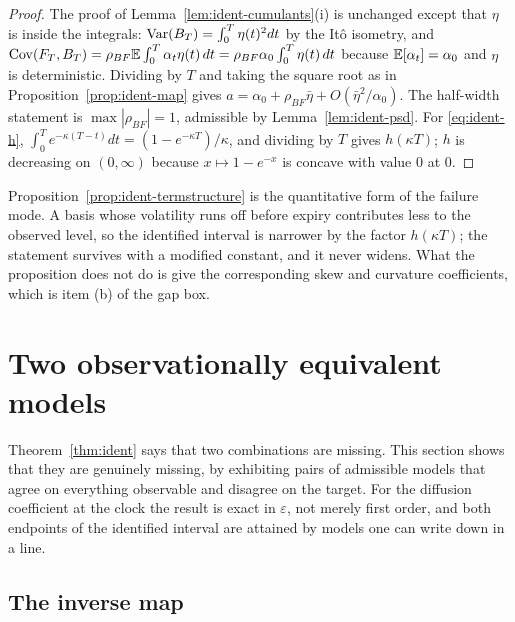 \documentclass[../../../main.tex]{subfiles}
\begin{document}
\begin{proof}
The proof of Lemma~\ref{lem:ident-cumulants}(i) is unchanged except that $\eta$ is inside the integrals: $\operatorname{Var}(B_T)=\int_0^T\eta(t)^2dt$ by the It\^o isometry, and $\operatorname{Cov}(F_T,B_T)=\rho_{BF}\mathbb{E}\int_0^T\alpha_t\eta(t)\,dt=\rho_{BF}\alpha_0\int_0^T\eta(t)\,dt$ because $\mathbb{E}[\alpha_t]=\alpha_0$ and $\eta$ is deterministic. Dividing by $T$ and taking the square root as in Proposition~\ref{prop:ident-map} gives $a=\alpha_0+\rho_{BF}\bar\eta+O(\bar\eta^2/\alpha_0)$. The half-width statement is $\max|\rho_{BF}|=1$, admissible by Lemma~\ref{lem:ident-psd}. For \eqref{eq:ident-h}, $\int_0^Te^{-\kappa(T-t)}dt=(1-e^{-\kappa T})/\kappa$, and dividing by $T$ gives $h(\kappa T)$; $h$ is decreasing on $(0,\infty)$ because $x\mapsto1-e^{-x}$ is concave with value $0$ at $0$.
\end{proof}

Proposition~\ref{prop:ident-termstructure} is the quantitative form of the failure mode. A basis whose volatility runs off before expiry contributes less to the observed level, so the identified interval is narrower by the factor $h(\kappa T)$; the statement survives with a modified constant, and it never widens. What the proposition does not do is give the corresponding skew and curvature coefficients, which is item (b) of the gap box.

\section{Two observationally equivalent models}\label{sec:ident-thm4}

Theorem~\ref{thm:ident} says that two combinations are missing. This section shows that they are genuinely missing, by exhibiting pairs of admissible models that agree on everything observable and disagree on the target. For the diffusion coefficient at the clock the result is exact in $\varepsilon$, not merely first order, and both endpoints of the identified interval are attained by models one can write down in a line.

\subsection{The inverse map}
\end{document}
